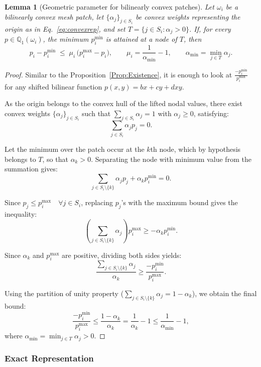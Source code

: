 \documentclass[a4paper]{article}
\theoremstyle{plain}
\newtheorem{lemma}{Lemma}
\theoremstyle{definition}
\theoremstyle{remark}
\begin{document}
\begin{lemma}[Geometric parameter for bilinearly convex patches]
Let $\omega_i$ be a bilinearly convex mesh patch, let $\{\alpha_j\}_{j\in S_i}$ be convex weights representing the origin as in Eq.~\eqref{eq:convexrep}, and 	set $T = \{ j \in S_i : \alpha_j > 0 \}$. If, for every $p \in \mathbb{Q}_1(\omega_i)$, the minimum $p_i^{\min}$ is attained at a node of $T$, then
\begin{equation*}
		p_i - p_i^{\min} \;\le\; \mu_i \,\bigl( p_i^{\max} - p_i \bigr),
		\qquad
		\mu_i = \frac{1}{\alpha_{\min}} - 1,
		\qquad
		\alpha_{\min} = \min_{j \in T} \alpha_j .
\end{equation*}
\label{general_formula}
\end{lemma}

\begin{proof}
Similar to the Proposition~\ref{Prop:Existence}, it is enough to look at $\frac{-p_i^{\min}}{p_i^{\max}}$ for any shifted bilinear function $p(x,y) = bx + cy + dxy$.
	
As the origin belongs to the convex hull of the lifted nodal values, there exist convex weights $\{\alpha_j\}_{j \in S_i}$ such that $\sum_{j \in S_i} \alpha_j = 1$ with $\alpha_j \geq 0$, satisfying:
$$
\sum_{j \in S_i} \alpha_j p_j = 0.
$$
	
Let the minimum over the patch occur at the $k$th node, which by hypothesis
belongs to $T$, so that $\alpha_k > 0$. Separating the node with minimum value from the summation gives:
$$
\sum_{j \in S_i \setminus \{k\}} \alpha_j p_j + \alpha_k p_i^{\min} = 0.
$$
	
Since $p_j \leq p_i^{\max} \quad  \forall j \in S_i$, replacing $p_j$'s with the maximum bound gives the inequality:
$$
\left( \sum_{j \in S_i \setminus \{k\}} \alpha_j \right) p_i^{\max} \geq -\alpha_k p_i^{\min}.
$$
	
Since $\alpha_k$ and $p_i^{\max}$ are positive, dividing both sides yields:
$$
\frac{\sum_{j \in S_i \setminus \{k\}} \alpha_j}{\alpha_k} \geq \frac{-p_i^{\min}}{p_i^{\max}}.
$$
	
Using the partition of unity property ($\sum_{j \in S_i \setminus \{k\}} \alpha_j = 1 - \alpha_k$), we obtain the final bound:
$$
\frac{-p_i^{\min}}{p_i^{\max}} \leq \frac{1 - \alpha_k}{\alpha_k} = \frac{1}{\alpha_k} - 1 \leq \frac{1}{\alpha_{\min}} - 1,
$$
where $\alpha_{\min} = \min_{j \in T} \alpha_j > 0$.
\end{proof}

\subsubsection{Exact Representation}\label{sec:exacrep}
\end{document}
